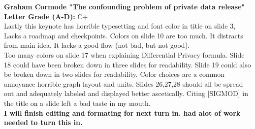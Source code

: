 \documentclass[11pt]{article}
\newcommand\LGRADE{\vspace{.10in}\textbf{Letter Grade (A-D):  }} \\
\begin{document}
\textbf{Graham Cormode "The confounding problem of private data release" }\\
\LGRADE C+ \\
Lastly this keynote has horrible typesetting and font color in title on slide 3, Lacks a roadmap and checkpoints.
Colors on slide 10 are too much. It distracts from main idea. It lacks a good flow (not bad, but not good).\\ 
Too many colors on slide 17 when explaining Differential Privacy formula. Slide 18 could have been broken down 
in three slides for readability. Slide 19 could also be broken down in two slides for readability.
Color choices are a common annoyance horrible graph layout and units. Slides 26,27,28 should all be spread out and 
adequately labeled and displayed better ascetically. Citing [SIGMOD] in the title on a slide left a bad taste in my mouth.\\


\textbf{I will finish editing and formating for next turn in. had alot of work needed to turn this in.}\\
\end{document}
